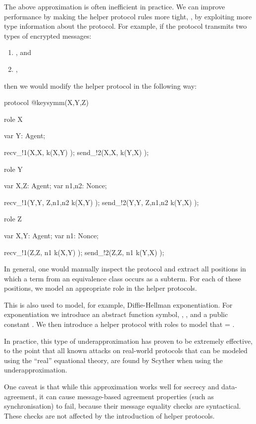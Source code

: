 \documentclass{book}
\begin{document}
The above approximation is often inefficient in practice.
We can improve performance by making the helper protocol rules more
tight, \ie, by exploiting more type information about the protocol.
For example, if the protocol transmits two types of encrypted messages:
\begin{enumerate}
	\item {}, and
	\item {},
\end{enumerate}
then we would modify the helper protocol in the following way:
\begin{spdl}
protocol @keysymm(X,Y,Z) {
  role X {
    var Y: Agent;

    recv_!1(X,X,  k(X,Y)  );
    send_!2(X,X,  k(Y,X)  );
  }
  role Y {
    var X,Z: Agent;
    var n1,n2: Nonce;

    recv_!1(Y,Y,  { Z,n1,n2 }k(X,Y)  );
    send_!2(Y,Y,  { Z,n1,n2 }k(Y,X)  );
  }
  role Z {
    var X,Y: Agent;
    var n1: Nonce;

    recv_!1(Z,Z,  { n1 }k(X,Y)  );
    send_!2(Z,Z,  { n1 }k(Y,X)  );
  }
}
\end{spdl}
In general, one would manually inspect the protocol and extract all
positions in which a term from an equivalence class occurs as a subterm.
For each of these positions, we model an appropriate role in the helper
protocols.

This is also used to model, for example, Diffie-Hellman
exponentiation. For exponentiation we introduce an abstract function
symbol, \eg, , and a public constant . We then introduce
a helper protocol with roles to model that 
 = 
.

In practice, this type of underapproximation has proven to be extremely
effective, to the point that all known attacks on real-world protocols
that can be modeled using the ``real'' equational theory, are found by
Scyther when using the underapproximation.

One caveat is that while this approximation works well for secrecy and
data-agreement, it can cause message-based agreement properties (such as
synchronisation) to fail, because their message equality checks are
syntactical. These checks are not affected by the introduction of helper
protocols.

\end{document}
